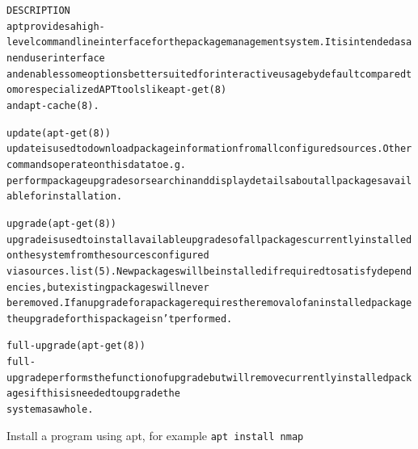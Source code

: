 \documentclass[Screen16to9,17pt]{foils}
\begin{document}


\begin{alltt}\footnotesize
DESCRIPTION
apt provides a high-level commandline interface for the package management system. It is intended as an end user interface
and enables some options better suited for interactive usage by default compared to more specialized APT tools like apt-get(8)
and apt-cache(8).

update (apt-get(8))
  update is used to download package information from all configured sources. Other commands operate on this data to e.g.
  perform package upgrades or search in and display details about all packages available for installation.

upgrade (apt-get(8))
  upgrade is used to install available upgrades of all packages currently installed on the system from the sources configured
  via sources.list(5). New packages will be installed if required to satisfy dependencies, but existing packages will never
  be removed. If an upgrade for a package requires the removal of an installed package the upgrade for this package isn't performed.

full-upgrade (apt-get(8))
  full-upgrade performs the function of upgrade but will remove currently installed packages if this is needed to upgrade the
  system as a whole.
\end{alltt}

\begin{list2}
  \item Install a program using apt, for example \verb+apt install nmap+
\end{list2}






\end{document}
